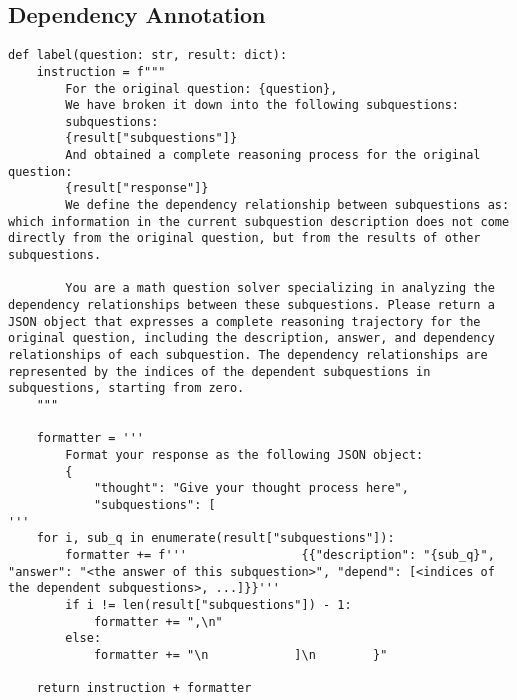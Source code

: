 \subsection{Dependency Annotation}
\label{appendix:label}
\begin{lstlisting}[style=PythonStyle, caption={Dependency Annotation Prompt Template}]
def label(question: str, result: dict):
    instruction = f"""
        For the original question: {question},
        We have broken it down into the following subquestions:
        subquestions:
        {result["subquestions"]}
        And obtained a complete reasoning process for the original question:
        {result["response"]}
        We define the dependency relationship between subquestions as: which information in the current subquestion description does not come directly from the original question, but from the results of other subquestions.
        
        You are a math question solver specializing in analyzing the dependency relationships between these subquestions. Please return a JSON object that expresses a complete reasoning trajectory for the original question, including the description, answer, and dependency relationships of each subquestion. The dependency relationships are represented by the indices of the dependent subquestions in subquestions, starting from zero.
    """
    
    formatter = '''
        Format your response as the following JSON object:
        {
            "thought": "Give your thought process here",
            "subquestions": [
'''
    for i, sub_q in enumerate(result["subquestions"]):
        formatter += f'''                {{"description": "{sub_q}", "answer": "<the answer of this subquestion>", "depend": [<indices of the dependent subquestions>, ...]}}'''
        if i != len(result["subquestions"]) - 1:
            formatter += ",\n"
        else:
            formatter += "\n            ]\n        }"
    
    return instruction + formatter
\end{lstlisting}
